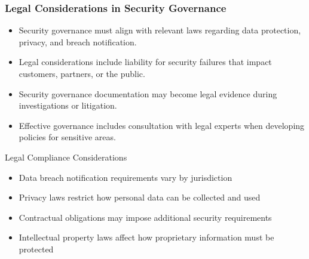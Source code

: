 \documentclass{beamer}
\begin{document}
\begin{frame}
\frametitle{Legal Considerations in Security Governance}
\begin{itemize}
\item Security governance must align with relevant laws regarding data protection, privacy, and breach notification.
\item Legal considerations include liability for security failures that impact customers, partners, or the public.
\item Security governance documentation may become legal evidence during investigations or litigation.
\item Effective governance includes consultation with legal experts when developing policies for sensitive areas.
\end{itemize}

\begin{alertblock}{Legal Compliance Considerations}
\scriptsize
\begin{itemize}
\item Data breach notification requirements vary by jurisdiction
\item Privacy laws restrict how personal data can be collected and used
\item Contractual obligations may impose additional security requirements
\item Intellectual property laws affect how proprietary information must be protected
\end{itemize}
\end{alertblock}
\end{frame}
\end{document}
